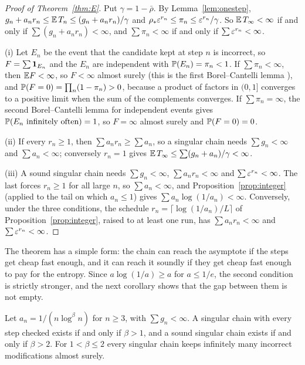 \begin{proof}[Proof of Theorem~\ref{thm:E}]
Put $\gamma=1-\bar\rho$. By Lemma~\ref{lem:onestep}, $g_{n}+a_{n}r_{n}\le\mathbb{E}\,T_{n}\le(g_{n}+a_{n}r_{n})/\gamma$ and $\rho_{\ast}\varepsilon^{r_{n}}\le\pi_{n}\le\varepsilon^{r_{n}}/\gamma$. So $\mathbb{E}\,T_{\infty}<\infty$ if and only if $\sum(g_{n}+a_{n}r_{n})<\infty$, and $\sum\pi_{n}<\infty$ if and only if $\sum\varepsilon^{r_{n}}<\infty$.

(i) Let $E_{n}$ be the event that the candidate kept at step $n$ is incorrect, so $F=\sum\mathbf{1}_{E_{n}}$ and the $E_{n}$ are independent with $\mathbb{P}(E_{n})=\pi_{n}<1$. If $\sum\pi_{n}<\infty$, then $\mathbb{E} F<\infty$, so $F<\infty$ almost surely (this is the first Borel--Cantelli lemma \cite{Bor09,Dur19}), and $\mathbb{P}(F=0)=\prod_{n}(1-\pi_{n})>0$, because a product of factors in $(0,1]$ converges to a positive limit when the sum of the complements converges. If $\sum\pi_{n}=\infty$, the second Borel--Cantelli lemma for independent events gives $\mathbb{P}(E_{n}\text{ infinitely often})=1$, so $F=\infty$ almost surely and $\mathbb{P}(F=0)=0$.

(ii) If every $r_{n}\ge1$, then $\sum a_{n}r_{n}\ge\sum a_{n}$, so a singular chain needs $\sum g_{n}<\infty$ and $\sum a_{n}<\infty$; conversely $r_{n}=1$ gives $\mathbb{E}\,T_{\infty}\le\sum(g_{n}+a_{n})/\gamma<\infty$.

(iii) A sound singular chain needs $\sum g_{n}<\infty$, $\sum a_{n}r_{n}<\infty$ and $\sum\varepsilon^{r_{n}}<\infty$. The last forces $r_{n}\ge1$ for all large $n$, so $\sum a_{n}<\infty$, and Proposition~\ref{prop:integer} (applied to the tail on which $a_{n}\le1$) gives $\sum a_{n}\log(1/a_{n})<\infty$. Conversely, under the three conditions, the schedule $r_{n}=\lceil\log(1/a_{n})/L\rceil$ of Proposition~\ref{prop:integer}, raised to at least one run, has $\sum a_{n}r_{n}<\infty$ and $\sum\varepsilon^{r_{n}}<\infty$.
\end{proof}

The theorem has a simple form: the chain can reach the asymptote if the steps get cheap fast enough, and it can reach it soundly if they get cheap fast enough to pay for the entropy. Since $a\log(1/a)\ge a$ for $a\le1/e$, the second condition is strictly stronger, and the next corollary shows that the gap between them is not empty.

\begin{corollary}\label{cor:gap}
Let $a_{n}=1/(n\log^{\beta}n)$ for $n\ge3$, with $\sum g_{n}<\infty$. A singular chain with every step checked exists if and only if $\beta>1$, and a sound singular chain exists if and only if $\beta>2$. For $1<\beta\le2$ every singular chain keeps infinitely many incorrect modifications almost surely.
\end{corollary}

